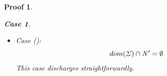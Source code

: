 \documentclass[showabstract,showacknowledgments,showpreface,showdedication]{iuphd}
\newtheorem*{bcase}{Case}
\theoremstyle{nonumberplain}
\newtheorem{nproof}{Proof}
\begin{document}
\begin{nproof}
\begin{bcase}
\begin{itemize}
\begin{itemize}
\begin{itemize}
        The first conjunct discharges by inversion on \dletlocstart{},
        and the second as a consequence of having already
        established just above that $0 > \allocptr{\reg}{\STOR}$.
        \item Case ():
        The obligation for this case is to establish that
        for each $(\reg \mapsto \emptyset) \in \AENV' = \AENV \cup \set{\reg \mapsto \locreg{\loc}{\reg}}$, it
        is the case that $\reg \not \in dom(\STOR)$.
        The part of this obligation pertaining to environment $\AENV$
        is given by the premise of this lemma, and thus it only remains
        to establish that the property holds for the rest, namely
        $\set{\reg \mapsto \locreg{\loc}{\reg}}$.
        This part discharges trivially, because $(\reg \mapsto \emptyset) \not \in \AENV'$,
        thereby discharging this case.
        \end{itemize}
      \item
      Case ():
      \begin{displaymath}
      dom(\mathit{\Sigma}) \cap \mathit{N}' = \emptyset
      \end{displaymath}
      This case discharges straightforwardly.
      \end{itemize}
    \end{itemize}
  \end{bcase}


\end{nproof}
\end{document}
